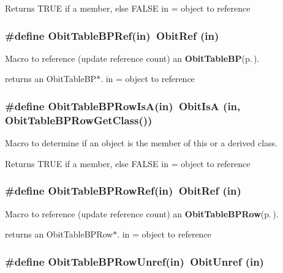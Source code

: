 Returns TRUE if a member, else FALSE in = object to reference 
\subsubsection{\setlength{\rightskip}{0pt plus 5cm}\#define Obit\-Table\-BPRef(in)\ Obit\-Ref (in)}\label{ObitTableBP_8h_a2}


Macro to reference (update reference count) an {\bf Obit\-Table\-BP}{\rm (p.\,\pageref{structObitTableBP})}. 

returns an Obit\-Table\-BP$\ast$. in = object to reference 
\subsubsection{\setlength{\rightskip}{0pt plus 5cm}\#define Obit\-Table\-BPRow\-Is\-A(in)\ Obit\-Is\-A (in, Obit\-Table\-BPRow\-Get\-Class())}\label{ObitTableBP_8h_a6}


Macro to determine if an object is the member of this or a derived class. 

Returns TRUE if a member, else FALSE in = object to reference 
\subsubsection{\setlength{\rightskip}{0pt plus 5cm}\#define Obit\-Table\-BPRow\-Ref(in)\ Obit\-Ref (in)}\label{ObitTableBP_8h_a5}


Macro to reference (update reference count) an {\bf Obit\-Table\-BPRow}{\rm (p.\,\pageref{structObitTableBPRow})}. 

returns an Obit\-Table\-BPRow$\ast$. in = object to reference 
\subsubsection{\setlength{\rightskip}{0pt plus 5cm}\#define Obit\-Table\-BPRow\-Unref(in)\ Obit\-Unref (in)}\label{ObitTableBP_8h_a4}



